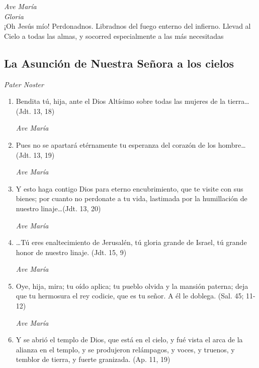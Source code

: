 \documentclass[a4paper,11pt, oneside]{report}
\begin{document}
      \textit{Ave María} \\
      \indent\textit{Gloria} \\
      \indent¡Oh Jesús mío! Perdonadnos. Libradnos del fuego enterno del infierno. Llevad al Cielo a todas las almas, y socorred especialmente a las más 
      necesitadas

    \subsection*{ La Asunción de Nuestra Señora a los cielos }

      \textit{Pater Noster}

      \begin{enumerate}

        \item Bendita tú, hija, ante el Dios Altísimo sobre todas las mujeres de la tierra\ldots (Jdt. 13, 18)

        \textit{Ave María}

        \item Pues no se apartará etérnamente tu esperanza del corazón de los hombre\ldots (Jdt. 13, 19)

        \textit{Ave María}

        \item Y esto haga contigo Dios para eterno encubrimiento, que te visite con sus bienes; por cuanto no perdonate
        a tu vida, lastimada por la humillación de nuestro linaje\ldots (Jdt. 13, 20)

        \textit{Ave María}

        \item {\ldots}Tú eres enaltecimiento de Jerusalén, tú gloria grande de Israel, tú grande honor de nuestro linaje. (Jdt. 15, 9)

        \textit{Ave María}

        \item Oye, hija, mira; tu oído aplica; tu pueblo olvida y la mansión paterna; deja que tu hermosura
        el rey codicie, que es tu señor. A él le doblega. (Sal. 45; 11-12)

        \textit{Ave María}

        \item Y se abrió el templo de Dios, que está en el cielo, y fué vista el arca de la alianza en el templo,
        y se produjeron relámpagos, y voces, y truenos, y temblor de tierra, y fuerte granizada. (Ap. 11, 19)


\end{enumerate}
\end{document}
